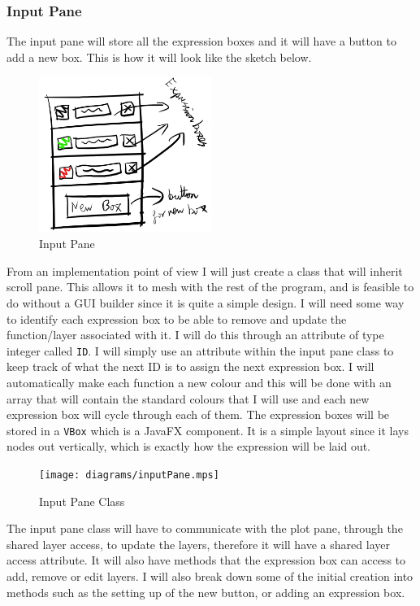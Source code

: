 \documentclass[../../../../main.tex]{subfiles}
\begin{document}
\subsubsection{Input Pane}
The input pane will store all the expression boxes and it will have a button to add a new box. This is how it will look like the sketch below.\\
\begin{figure}
	\centering
	\includegraphics[width=0.5\textwidth]{images/inputPane}
	\caption{Input Pane}
\end{figure}
From an implementation point of view I will just create a class that will inherit scroll pane. This allows it to mesh with the rest of the program, and is feasible to do without a GUI builder since it is quite a simple design. I will need some way to identify each expression box to be able to remove and update the function/layer associated with it. I will do this through an attribute of type integer called \texttt{ID}. I will simply use an attribute within the input pane class to keep track of what the next ID is to assign the next expression box. I will automatically make each function a new colour and this will be done with an array that will contain the standard colours that I will use and each new expression box will cycle through each of them. The expression boxes will be stored in a \texttt{VBox} which is a JavaFX component. It is a simple layout since it lays nodes out vertically, which is exactly how the expression will be laid out.\\
\begin{figure}[H]
	\centering
	\texttt{[image: diagrams/inputPane.mps]}
	\caption{Input Pane Class}
\end{figure}
The input pane class will have to communicate with the plot pane, through the shared layer access, to update the layers, therefore it will have a shared layer access attribute. It will also have methods that the expression box can access to add, remove or edit layers. I will also break down some of the initial creation into methods such as the setting up of the new button, or adding an expression box.
\newpage
\end{document}

